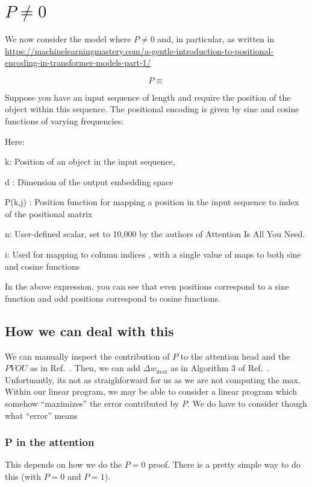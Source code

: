 \section{$P \neq 0$}


We now consider the model where $P \neq 0$ and, in particular, as written in \url{https://machinelearningmastery.com/a-gentle-introduction-to-positional-encoding-in-transformer-models-part-1/}

\[P \equiv \]

Suppose you have an input sequence of length 
 and require the position of the 
 object within this sequence. The positional encoding is given by sine and cosine functions of varying frequencies:

 
 
 

Here:

k: Position of an object in the input sequence, 

d : Dimension of the output embedding space

P(k,j) : Position function for mapping a position 
 in the input sequence to index 
 of the positional matrix

n: User-defined scalar, set to 10,000 by the authors of Attention Is All You Need.

i: Used for mapping to column indices 
, with a single value of 
 maps to both sine and cosine functions

In the above expression, you can see that even positions correspond to a sine function and odd positions correspond to cosine functions.

\subsection{How we can deal with this}
We can manually inspect the contribution of $P$ to the attention head and the $PVOU$ as in Ref.~\cite{gross2024compact}. Then, we can add $\Delta w_{\max}$ as in Algorithm 3 of Ref.~\cite{gross2024compact}. Unfortuantly, its not as straighforward for us as we are not computing the max.
Within our linear program, we may be able to consider a linear program which somehow ``maximizes'' the error contributed by $P$. We do have to consider though what ``error'' means

\subsubsection{P in the attention}
This depends on how we do the $P = 0$ proof. There is a pretty simple way to do this (with $P = 0$ and $P = 1$). 

